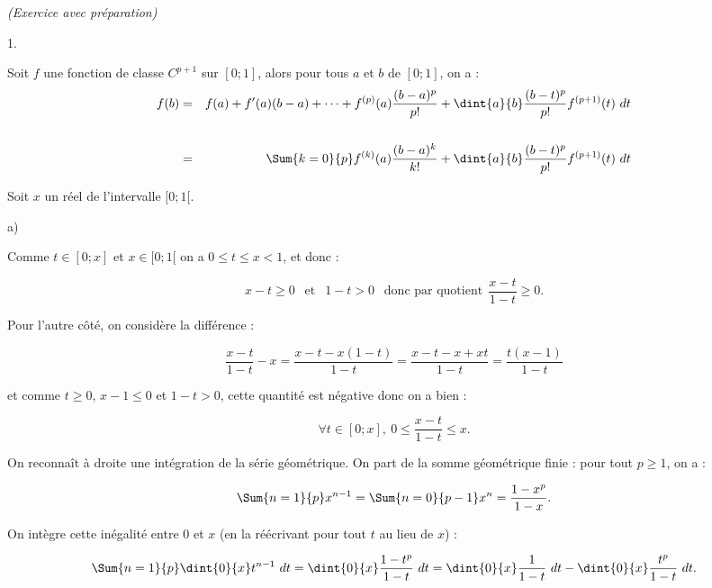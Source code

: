 \documentclass[11pt]{article}%
\begin{document}
 \newpage

 \begin{exercice}{\it (Exercice avec préparation)}~
 \begin{noliste}{1.}
 \setlength{\itemsep}{4mm}
 \item Soit $f$ une fonction de classe $C^{p + 1}$ sur $[0;1]$, alors
pour tous $a$ et $b$ de $[0;1]$, on a :
 \begin{eqnarray*}
 f(b) & = & f(a) + f'(a) (b-a) + \dots + f^{(p)} (a) \frac{ (b-a)^{p}
}{ p! } + \dint{a}{b} \frac{ (b-t)^{p} }{ p ! } f^{ (p + 1) } (t) \ dt
\\
\\
 & = & \Sum{k = 0}{p} f^{ (k) } (a) \frac{ (b-a)^{k} }{ k! } +
\dint{a}{b} \frac{ (b-t)^{p} }{ p ! } f^{ (p + 1) } (t) \ dt 
 \end{eqnarray*}

 \item Soit $x$ un réel de l'intervalle $[0;1[$. \begin{noliste}{a)}
 \setlength{\itemsep}{2mm}

 \item Comme $t \in [0;x]$ et $x \in [0;1[$ on a $0 \leq t \leq x < 1$,
et donc : 
 
\[
 x - t \geq 0 \ \ \text{ et } \ \ 1-t > 0 \ \ \text{ donc par quotient
} \ \ \frac{ x-t }{ 1-t } \geq 0. 
\]

 Pour l'autre côté, on considère la différence : 
 
\[
 \frac{ x-t }{ 1-t } - x = \frac{ x - t - x (1-t ) }{ 1 - t } = \frac{
x - t - x + x t }{ 1 - t } = \frac{ t (x-1 ) }{ 1 - t } 
\]

 et comme $t \geq 0$, $x-1 \leq 0$ et $1-t > 0$, cette quantité est
négative donc on a bien : 
 
\[
 \forall t \in [0 ; x ], \ 0 \leq \frac{ x - t }{ 1 - t } \leq x. 
\]

 \item On reconnaît à droite une intégration de la série géométrique.
On part de la somme géométrique finie : pour tout $p \geq 1$, on a : 
 
\[
 \Sum{n = 1}{p} x^{n-1} = \Sum{n = 0}{p-1} x^{n} = \frac{ 1 - x^{p} }{
1 - x }. 
\]

 On intègre cette inégalité entre 0 et $x$ (en la réécrivant pour tout
$t$ au lieu de $x$) : 
 
\[
 \Sum{n = 1}{p} \dint{0}{x} t^{n-1} \ dt = \dint{0}{x} \frac{ 1 - t^{p}
}{ 1 - t } \ dt = \dint{0}{x} \frac{ 1 }{ 1-t } \ dt - \dint{0}{x}
\frac{ t^{p} }{ 1-t } \ dt. 
\]


\end{noliste}
\end{noliste}
\end{exercice}
\end{document}
